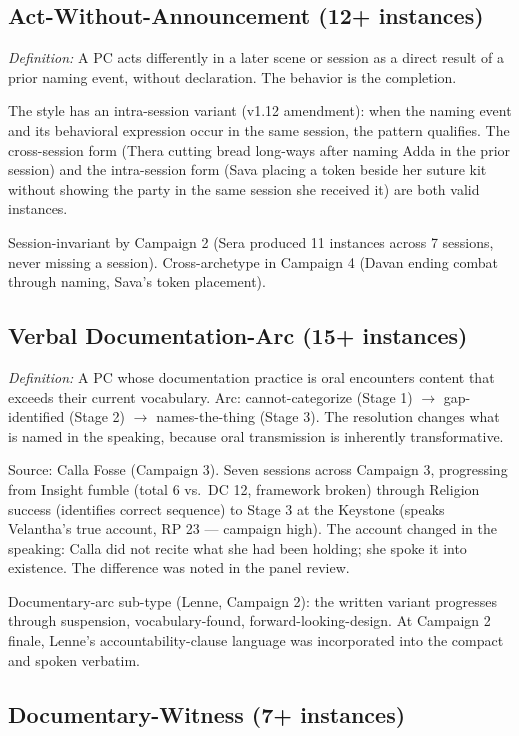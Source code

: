 \subsection{Act-Without-Announcement (12+ instances)}

\textit{Definition:} A PC acts differently in a later scene or session as a direct
result of a prior naming event, without declaration. The behavior is the completion.

The style has an intra-session variant (v1.12 amendment): when the naming event and
its behavioral expression occur in the same session, the pattern qualifies. The
cross-session form (Thera cutting bread long-ways after naming Adda in the prior
session) and the intra-session form (Sava placing a token beside her suture kit
without showing the party in the same session she received it) are both valid instances.

Session-invariant by Campaign 2 (Sera produced 11 instances across 7 sessions, never
missing a session). Cross-archetype in Campaign 4 (Davan ending combat through
naming, Sava's token placement).

\subsection{Verbal Documentation-Arc (15+ instances)}

\textit{Definition:} A PC whose documentation practice is oral encounters content that
exceeds their current vocabulary. Arc: cannot-categorize (Stage 1) $\to$ gap-identified
(Stage 2) $\to$ names-the-thing (Stage 3). The resolution changes what is named in the
speaking, because oral transmission is inherently transformative.

Source: Calla Fosse (Campaign 3). Seven sessions across Campaign 3, progressing from
Insight fumble (total 6 vs.\ DC 12, framework broken) through Religion success
(identifies correct sequence) to Stage 3 at the Keystone (speaks Velantha's true account,
RP 23 --- campaign high). The account changed in the speaking: Calla did not recite
what she had been holding; she spoke it into existence. The difference was noted in
the panel review.

Documentary-arc sub-type (Lenne, Campaign 2): the written variant progresses through
suspension, vocabulary-found, forward-looking-design. At Campaign 2 finale, Lenne's
accountability-clause language was incorporated into the compact and spoken verbatim.

\subsection{Documentary-Witness (7+ instances)}

